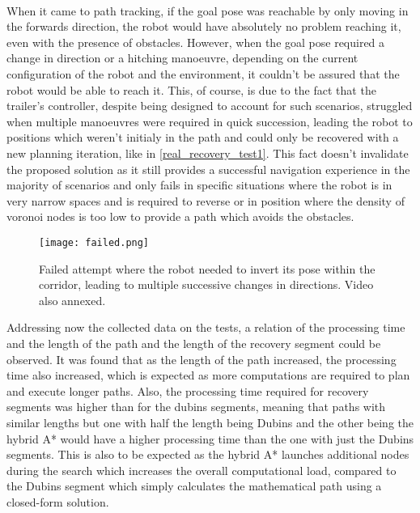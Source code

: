 \paragraph{} When it came to path tracking, if the goal pose was reachable by only moving 
in the forwards direction, the robot would have absolutely no problem reaching it, even with 
the presence of obstacles. However, when the goal pose required a change in direction 
or a hitching manoeuvre, depending on the current configuration of the robot and the 
environment, it couldn't be assured that the robot would be able to reach it. This, 
of course, is due to the fact that the trailer's controller, despite being designed to 
account for such scenarios, struggled when multiple manoeuvres were required in quick 
succession, leading the robot to positions which weren't initialy in the path and could only 
be recovered with a new planning iteration, like in \ref{real_recovery_test1}. This fact doesn't invalidate the proposed 
solution as it still provides a successful navigation experience in the majority of 
scenarios and only fails in specific situations where the  robot is in very narrow spaces 
and is required to reverse or in position where the density of voronoi nodes is too low 
to provide a path which avoids the obstacles. 
\begin{figure}[h]
    \centering
    \texttt{[image: failed.png]}
    \caption{Failed attempt where the robot needed to invert its pose within the corridor, leading to multiple successive changes in directions. Video also annexed.}
    \label{fig:sim_obstacle_detection3}
\end{figure}

Addressing now the collected data on the tests, a relation of the processing time and the 
length of the path and the length of the recovery segment could be observed. It was found 
that as the length of the path increased, the processing time also increased, which is 
expected as more computations are required to plan and execute longer paths. Also, the processing 
time required for recovery segments was higher than for the dubins segments, meaning that 
paths with similar lengths but one with half the length being Dubins and the other being 
the hybrid A* would have a higher processing time than the one with just the Dubins segments. 
This is also to be expected as the hybrid A* launches additional nodes during the search which 
increases the overall computational load, compared to the Dubins segment which simply calculates 
the mathematical path using a closed-form solution.

